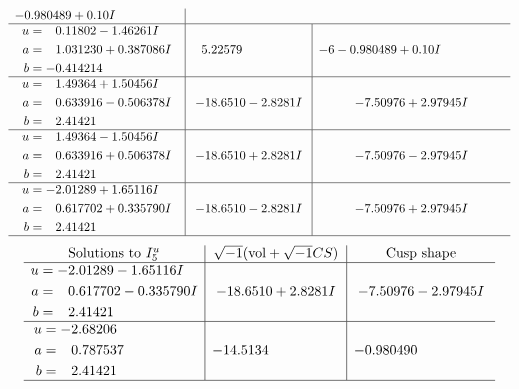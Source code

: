 \documentclass[1p]{elsarticle_modified}
\theoremstyle{definition}
\newcommand{\I}{\sqrt{-1}}
\begin{document}
$$\begin{array}{c|c|c}
-0.980489 + 0. 10   I\phantom{ +0.000000I} \\ \hline\begin{aligned}
u &= \phantom{-}0.11802 - 1.46261 I \\
a &= \phantom{-}1.031230 + 0.387086 I \\
b &= -0.414214\phantom{ +0.000000I}\end{aligned}
 & \phantom{-}5.22579\phantom{ +0.000000I} &                  -6
-0.980489 + 0. 10   I\phantom{ +0.000000I} \\ \hline\begin{aligned}
u &= \phantom{-}1.49364 + 1.50456 I \\
a &= \phantom{-}0.633916 - 0.506378 I \\
b &= \phantom{-}2.41421\phantom{ +0.000000I}\end{aligned}
 & -18.6510 - 2.8281 I & -7.50976 + 2.97945 I \\ \hline\begin{aligned}
u &= \phantom{-}1.49364 - 1.50456 I \\
a &= \phantom{-}0.633916 + 0.506378 I \\
b &= \phantom{-}2.41421\phantom{ +0.000000I}\end{aligned}
 & -18.6510 + 2.8281 I & -7.50976 - 2.97945 I \\ \hline\begin{aligned}
u &= -2.01289 + 1.65116 I \\
a &= \phantom{-}0.617702 + 0.335790 I \\
b &= \phantom{-}2.41421\phantom{ +0.000000I}\end{aligned}
 & -18.6510 - 2.8281 I & -7.50976 + 2.97945 I\\
 \hline 
 \end{array}$$\newpage$$\begin{array}{c|c|c}  
\text{Solutions to }I^u_{5}& \I (\text{vol} + \sqrt{-1}CS) & \text{Cusp shape}\\
 \hline 
\begin{aligned}
u &= -2.01289 - 1.65116 I \\
a &= \phantom{-}0.617702 - 0.335790 I \\
b &= \phantom{-}2.41421\phantom{ +0.000000I}\end{aligned}
 & -18.6510 + 2.8281 I & -7.50976 - 2.97945 I \\ \hline\begin{aligned}
u &= -2.68206\phantom{ +0.000000I} \\
a &= \phantom{-}0.787537\phantom{ +0.000000I} \\
b &= \phantom{-}2.41421\phantom{ +0.000000I}\end{aligned}
 & -14.5134\phantom{ +0.000000I} & -0.980490\phantom{ +0.000000I}\\
 \hline 
 \end{array}$$\newpage
\end{document}

